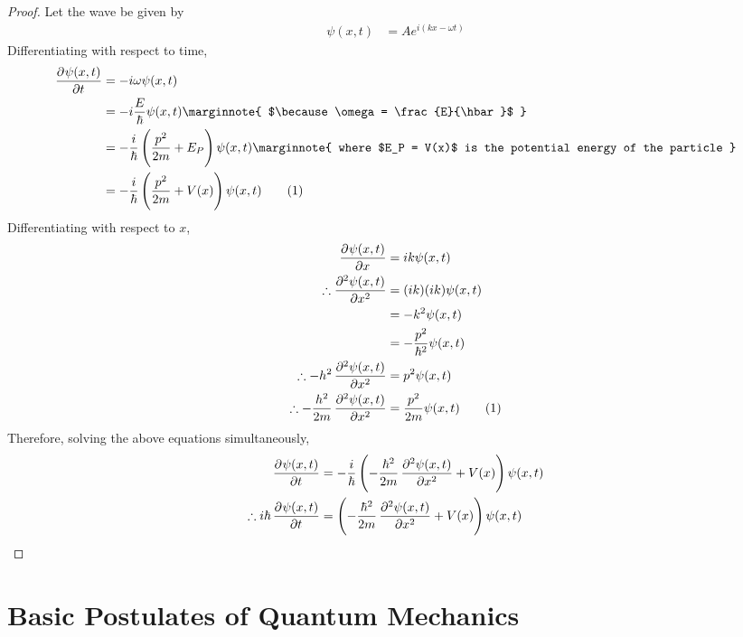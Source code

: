\documentclass[titlepage, fleqn, a4paper, 12pt, twoside]{article}
\newcommand\numberthis{\addtocounter{equation}{1}\tag{\theequation}} %
\theoremstyle{definition}
\theoremstyle{theorem}
\begin{document}
\begin{proof}
	Let the wave be given by
	\begin{align*}
		\psi(x,t) & = A e^{i (k x - \omega t)}
	\end{align*}
	Differentiating with respect to time,
	\begin{align*}
		\dpd{\psi(x,t)}{t}  & = -i \omega \psi(x,t) \\
                                    & = -i \frac{E}{\hbar} \psi(x,t)
		\marginnote
		{
			$\because \omega = \frac{E}{\hbar}$
		}                  \\
                                    & = -\frac{i}{\hbar} \left( \frac{p^2}{2 m} + E_P \right) \psi(x,t)
		\marginnote
		{
			where $E_P = V(x)$ is the potential energy of the particle
		}                  \\
                                    & = -\frac{i}{\hbar} \left( \frac{p^2}{2 m} + V(x) \right) \psi(x,t)
			\numberthis
	\end{align*}
	Differentiating with respect to $x$,
	\begin{align*}
		\dpd{\psi(x,t)}{x}                                & = i k \psi(x,t)                  \\
		\therefore \dpd[2]{\psi(x,t)}{x}                  & = (i k) (i k) \psi(x,t)          \\
                                                                  & = -k^2 \psi(x,t)                 \\
                                                                  & = -\frac{p^2}{\hbar^2} \psi(x,t) \\
		\therefore -h^2 \dpd[2]{\psi(x,t)}{x}             & = p^2 \psi(x,t)                  \\
		\therefore -\frac{h^2}{2 m} \dpd[2]{\psi(x,t)}{x} & = \frac{p^2}{2 m} \psi(x,t)
			\numberthis
	\end{align*}
	Therefore, solving the above equations simultaneously,
	\begin{align*}
		\dpd{\psi(x,t)}{t}                    & = -\frac{i}{\hbar} \left( -\frac{\hbar^2}{2 m} \dpd[2]{\psi(x,t)}{x} + V(x) \right) \psi(x,t) \\
		\therefore i \hbar \dpd{\psi(x,t)}{t} & = \left( -\frac{\hbar^2}{2 m} \dpd[2]{\psi(x,t)}{x} + V(x) \right) \psi(x,t)
	\end{align*}
\end{proof}

\section{Basic Postulates of Quantum Mechanics}
\end{document}
